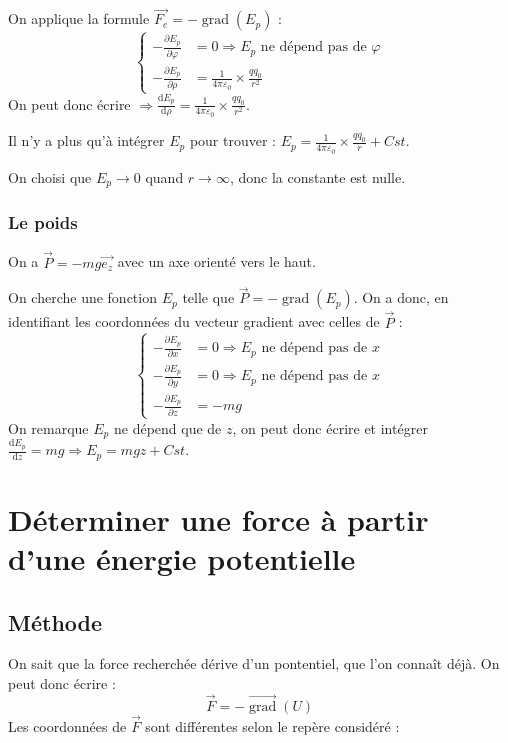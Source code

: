 \documentclass[french]{yLectureNote}
\renewcommand{\vec}{\overrightarrow}
\newcommand{\dd}[0]{\mathrm{d}}
\DeclareMathOperator\grad{grad}
\begin{document}
On applique la formule $\vec{F_e} = -\grad(E_p)$ :
\[\left\{\begin{matrix}
-\frac{\partial E_p}{\partial \varphi} &= 0 \Rightarrow E_p \text{ ne dépend pas de } \varphi\\
-\frac{\partial E_p}{\partial \rho} &= \frac{1}{4\pi\varepsilon_0}\times\frac{qq_0}{r^2}
\end{matrix}\right.\]
On peut donc écrire $\Rightarrow \frac{\dd E_p}{\dd \rho} = \frac{1}{4\pi\varepsilon_0}\times\frac{qq_0}{r^2}$.


Il n'y a plus qu'à intégrer $E_p$ pour trouver : $ E_p = \frac{1}{4\pi\varepsilon_0}\times\frac{qq_0}{r}+Cst$.

On choisi que $E_p\to0$ quand $r\to \infty$, donc la constante est nulle.
\subsubsection{Le poids}
On a $\vec{P} = -mg\vec{e_z}$ avec un axe orienté vers le haut.

On cherche une fonction $E_p$ telle que $\vec{P} = -\grad(E_p)$. On a donc, en identifiant les coordonnées du vecteur gradient avec celles de $\vec{P}$ :
\[\left\{\begin{matrix}
-\frac{\partial E_p}{\partial x} &= 0 \Rightarrow E_p \text{ ne dépend pas de } x\\
-\frac{\partial E_p}{\partial y} &= 0 \Rightarrow E_p \text{ ne dépend pas de } x\\
-\frac{\partial E_p}{\partial z} &= -mg
\end{matrix}\right.\]
On remarque $E_p$ ne dépend que de $z$, on peut donc écrire et intégrer $\frac{\dd E_p}{\dd z} = mg \Rightarrow E_p = mgz + Cst$.
\section{Déterminer une force à partir d'une énergie potentielle}
\subsection{Méthode}
On sait que la force recherchée dérive d'un pontentiel, que l'on conna\^it déjà. On peut donc écrire :\[\vec{F} = -\vec{\grad}(U)\]
Les coordonnées de $\vec{F}$ sont différentes selon le repère considéré :
\end{document}
